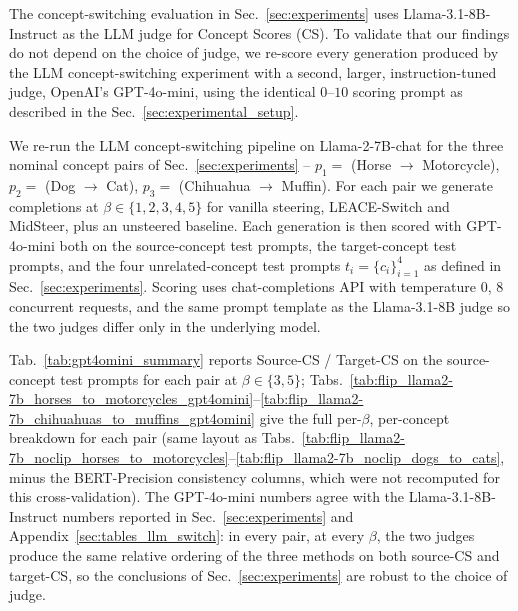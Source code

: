 The concept-switching evaluation in Sec.~\ref{sec:experiments} uses Llama-3.1-8B-Instruct as the LLM judge for Concept Scores (CS). To validate that our findings do not depend on the choice of judge, we re-score every generation produced by the LLM concept-switching experiment with a second, larger, instruction-tuned judge, OpenAI's GPT-4o-mini, using the identical $0$--$10$ scoring prompt as described in the Sec.~\ref{sec:experimental_setup}.

We re-run the LLM concept-switching pipeline on Llama-2-7B-chat for the three nominal concept pairs of Sec.~\ref{sec:experiments} -- $p_1 = $ (Horse $\to$ Motorcycle), $p_2 = $ (Dog $\to$ Cat), $p_3 = $ (Chihuahua $\to$ Muffin). For each pair we generate completions at $\beta \in \{1, 2, 3, 4, 5\}$ for vanilla steering, LEACE-Switch and MidSteer, plus an unsteered baseline. Each generation is then scored with GPT-4o-mini both on the source-concept test prompts, the target-concept test prompts, and the four unrelated-concept test prompts $t_i = \{c_i\}_{i=1}^{4}$ as defined in Sec.~\ref{sec:experiments}. Scoring uses chat-completions API with temperature $0$, $8$ concurrent requests, and the same prompt template as the Llama-3.1-8B judge so the two judges differ only in the underlying model.

Tab.~\ref{tab:gpt4omini_summary} reports Source-CS / Target-CS on the source-concept test prompts for each pair at $\beta\in\{3, 5\}$; Tabs.~\ref{tab:flip_llama2-7b_horses_to_motorcycles_gpt4omini}--\ref{tab:flip_llama2-7b_chihuahuas_to_muffins_gpt4omini} give the full per-$\beta$, per-concept breakdown for each pair (same layout as Tabs.~\ref{tab:flip_llama2-7b_noclip_horses_to_motorcycles}--\ref{tab:flip_llama2-7b_noclip_dogs_to_cats}, minus the BERT-Precision consistency columns, which were not recomputed for this cross-validation). The GPT-4o-mini numbers agree with the Llama-3.1-8B-Instruct numbers reported in Sec.~\ref{sec:experiments} and Appendix~\ref{sec:tables_llm_switch}: in every pair, at every $\beta$, the two judges produce the same relative ordering of the three methods on both source-CS and target-CS, so the conclusions of Sec.~\ref{sec:experiments} are robust to the choice of judge.










